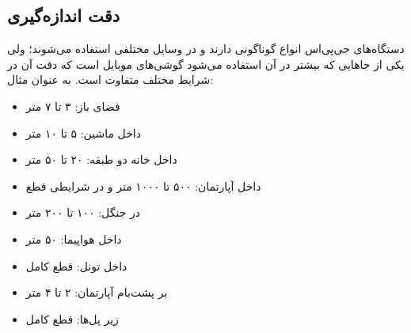 \subsection{دقت اندازه‌گیری}
دستگاه‌های جی‌پی‌اس انواع گوناگونی دارند و در وسایل مختلفی استفاده می‌شوند؛ ولی یکی از جاهایی که بیشتر در آن استفاده می‌شود گوشی‌های موبایل است که دقت آن در شرایط مختلف متفاوت است. به عنوان مثال:
\begin{itemize}
	\item فضای باز: ۳ تا ۷ متر
	\item داخل ماشین: ۵ تا ۱۰ متر
	\item داخل خانه دو طبقه: ۲۰ تا ۵۰ متر
	\item داخل آپارتمان: ۵۰۰ تا ۱۰۰۰ متر و در شرایطی قطع
	\item در جنگل: ۱۰۰ تا ۲۰۰ متر
	\item داخل هواپیما: ۵۰ متر
	\item داخل تونل: قطع کامل
	\item بر پشت‌بام آپارتمان: ۲ تا ۴ متر
	\item زیر پل‌ها: قطع کامل
\end{itemize}
